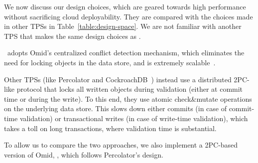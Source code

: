 We now discuss our design choices, which are geared towards high performance without sacrificing cloud deployability.
They are compared with the choices made in other TPSs in  Table~\ref{table:design-space}. 
We are not familiar with another TPS that makes the same design choices as \sysll. 





\sysll\ adopts Omid's centralized conflict detection mechanism, which eliminates the need for locking objects
in the data store, and is extremely scalable~\cite{Omid2017}. 

Other TPSs (like Percolator and  CockroachDB~\cite{cockroach}) instead use a distributed 2PC-like protocol that locks all written objects during validation (either at commit time or during the write). To this end, they use atomic check\&mutate operations on the underlying data store. This slows down either commits (in case of commit-time validation) or transactional writes (in case of write-time validation), which takes a toll on long transactions, where validation time is substantial. 

To allow us to compare the two approaches, we also implement a 2PC-based version of Omid, \syspc,
which follows Percolator's design.


